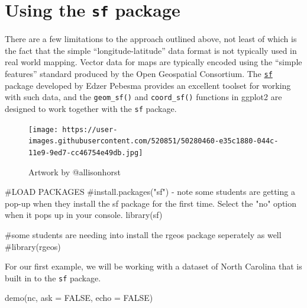 \documentclass[
  letterpaper,
  DIV=11,
  numbers=noendperiod]{scrartcl}
\newenvironment{Shaded}{\begin{snugshade}}{\end{snugshade}}
\newcommand{\AttributeTok}[1]{\textcolor[rgb]{0.40,0.45,0.13}{#1}}
\newcommand{\CommentTok}[1]{\textcolor[rgb]{0.37,0.37,0.37}{#1}}
\newcommand{\ConstantTok}[1]{\textcolor[rgb]{0.56,0.35,0.01}{#1}}
\newcommand{\FunctionTok}[1]{\textcolor[rgb]{0.28,0.35,0.67}{#1}}
\newcommand{\NormalTok}[1]{\textcolor[rgb]{0.00,0.23,0.31}{#1}}
\begin{document}
\hypertarget{using-the-sf-package}{%
\section{\texorpdfstring{Using the \texttt{sf}
package}{Using the sf package}}\label{using-the-sf-package}}

There are a few limitations to the approach outlined above, not least of
which is the fact that the simple ``longitude-latitude'' data format is
not typically used in real world mapping. Vector data for maps are
typically encoded using the ``simple features'' standard produced by the
Open Geospatial Consortium. The
\href{https://r-spatial.github.io/sf/}{\texttt{sf}} package developed by
Edzer Pebesma provides an excellent toolset for working with such data,
and the \texttt{geom\_sf()} and \texttt{coord\_sf()} functions in
ggplot2 are designed to work together with the \texttt{sf} package.

\begin{figure}

{\centering \texttt{[image: https://user-images.githubusercontent.com/520851/50280460-e35c1880-044c-11e9-9ed7-cc46754e49db.jpg]}

}

\caption{Artwork by @allisonhorst}

\end{figure}

\begin{Shaded}
\begin{Highlighting}[]
\CommentTok{\#LOAD PACKAGES}
\CommentTok{\#install.packages("sf") {-} note some students are getting a pop{-}up when they install the sf package for the first time. Select the "no" option when it pops up in your console. }
\FunctionTok{library}\NormalTok{(sf)}

\CommentTok{\#some students are needing into install the rgeos package seperately as well}
\CommentTok{\#library(rgeos)}
\end{Highlighting}
\end{Shaded}

For our first example, we will be working with a dataset of North
Carolina that is built in to the \texttt{sf} package.

\begin{Shaded}
\begin{Highlighting}[]
\FunctionTok{demo}\NormalTok{(nc, }\AttributeTok{ask =} \ConstantTok{FALSE}\NormalTok{, }\AttributeTok{echo =} \ConstantTok{FALSE}\NormalTok{)}
\end{Highlighting}
\end{Shaded}
\end{document}
